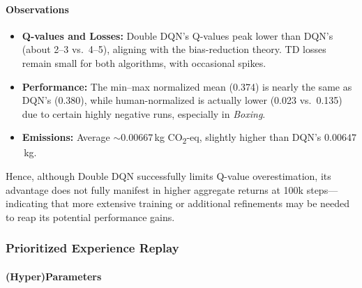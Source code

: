 \paragraph{Observations}
\begin{itemize}
	\item \textbf{Q-values and Losses:} Double DQN’s Q-values peak lower than DQN’s (about 2--3 vs.\ 4--5), aligning with the bias-reduction theory. TD losses remain small for both algorithms, with occasional spikes.
	\item \textbf{Performance:} The min--max normalized mean (0.374) is nearly the same as DQN’s (0.380), while human-normalized is actually lower (0.023 vs.\ 0.135) due to certain highly negative runs, especially in \emph{Boxing}.
	\item \textbf{Emissions:} Average $\sim0.00667$\,kg CO\textsubscript{2}-eq, slightly higher than DQN’s $0.00647$\,kg.
\end{itemize}

Hence, although Double DQN successfully limits Q-value overestimation, its advantage does not 
fully manifest in higher aggregate returns at 100k steps—indicating that more extensive training 
or additional refinements may be needed to reap its potential performance gains.


\subsubsection{Prioritized Experience Replay}
\label{subsubsec:per}

\paragraph{(Hyper)Parameters}

